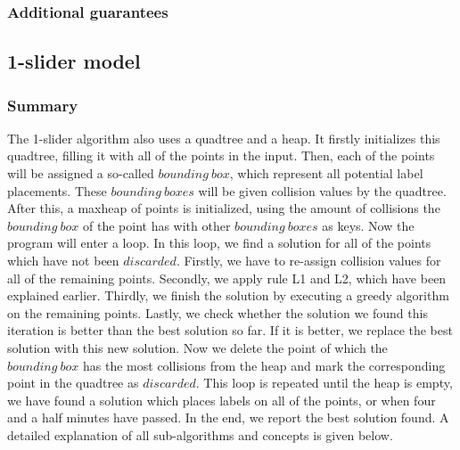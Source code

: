 \documentclass[crop=false,a4paper,oneside,11pt]{article}
\begin{document}
\subsubsection{Additional guarantees}


\subsection{1-slider model}
\subsubsection{Summary}
The 1-slider algorithm also uses a quadtree and a heap. It firstly initializes this quadtree, filling it with all of the points in the input. Then, each of the points will be assigned a so-called $bounding\ box$, which represent all potential label placements. These $bounding \ boxes$ will be given collision values by the quadtree. After this, a maxheap of points is initialized, using the amount of collisions the $bounding \ box$ of the point has with other $bounding \ boxes$ as keys. Now the program will enter a loop. In this loop, we find a solution for all of the points which have not been $discarded$. Firstly, we have to re-assign collision values for all of the remaining points. Secondly, we apply rule L1 and L2, which have been explained earlier. Thirdly, we finish the solution by executing a greedy algorithm on the remaining points. Lastly, we check whether the solution we found this iteration is better than the best solution so far. If it is better, we replace the best solution with this new solution. Now we delete the point of which the $bounding \ box$ has the most collisions from the heap and mark the corresponding point in the quadtree as $discarded$. This loop is repeated until the heap is empty, we have found a solution which places labels on all of the points, or when four and a half minutes have passed. In the end, we report the best solution found. A detailed explanation of all sub-algorithms and concepts is given below. \\
\end{document}
